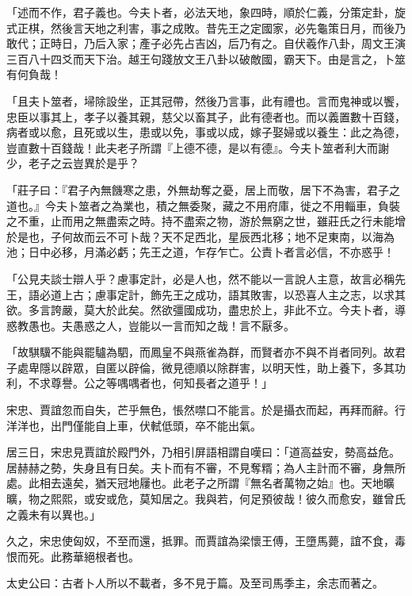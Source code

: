 \begin{pinyinscope}
「述而不作，君子義也。今夫卜者，必法天地，象四時，順於仁義，分策定卦，旋式正棋，然後言天地之利害，事之成敗。昔先王之定國家，必先龜策日月，而後乃敢代；正時日，乃后入家；產子必先占吉凶，后乃有之。自伏羲作八卦，周文王演三百八十四爻而天下治。越王句踐放文王八卦以破敵國，霸天下。由是言之，卜筮有何負哉！

「且夫卜筮者，埽除設坐，正其冠帶，然後乃言事，此有禮也。言而鬼神或以饗，忠臣以事其上，孝子以養其親，慈父以畜其子，此有德者也。而以義置數十百錢，病者或以愈，且死或以生，患或以免，事或以成，嫁子娶婦或以養生：此之為德，豈直數十百錢哉！此夫老子所謂『上德不德，是以有德』。今夫卜筮者利大而謝少，老子之云豈異於是乎？

「莊子曰：『君子內無饑寒之患，外無劫奪之憂，居上而敬，居下不為害，君子之道也。』今夫卜筮者之為業也，積之無委聚，藏之不用府庫，徙之不用輜車，負裝之不重，止而用之無盡索之時。持不盡索之物，游於無窮之世，雖莊氏之行未能增於是也，子何故而云不可卜哉？天不足西北，星辰西北移；地不足東南，以海為池；日中必移，月滿必虧；先王之道，乍存乍亡。公責卜者言必信，不亦惑乎！

「公見夫談士辯人乎？慮事定計，必是人也，然不能以一言說人主意，故言必稱先王，語必道上古；慮事定計，飾先王之成功，語其敗害，以恐喜人主之志，以求其欲。多言誇嚴，莫大於此矣。然欲彊國成功，盡忠於上，非此不立。今夫卜者，導惑教愚也。夫愚惑之人，豈能以一言而知之哉！言不厭多。

「故騏驥不能與罷驢為駟，而鳳皇不與燕雀為群，而賢者亦不與不肖者同列。故君子處卑隱以辟眾，自匿以辟倫，微見德順以除群害，以明天性，助上養下，多其功利，不求尊譽。公之等喁喁者也，何知長者之道乎！」

宋忠、賈誼忽而自失，芒乎無色，悵然噤口不能言。於是攝衣而起，再拜而辭。行洋洋也，出門僅能自上車，伏軾低頭，卒不能出氣。

居三日，宋忠見賈誼於殿門外，乃相引屏語相謂自嘆曰：「道高益安，勢高益危。居赫赫之勢，失身且有日矣。夫卜而有不審，不見奪糈；為人主計而不審，身無所處。此相去遠矣，猶天冠地屨也。此老子之所謂『無名者萬物之始』也。天地曠曠，物之熙熙，或安或危，莫知居之。我與若，何足預彼哉！彼久而愈安，雖曾氏之義未有以異也。」

久之，宋忠使匈奴，不至而還，抵罪。而賈誼為梁懷王傅，王墮馬薨，誼不食，毒恨而死。此務華絕根者也。

太史公曰：古者卜人所以不載者，多不見于篇。及至司馬季主，余志而著之。


\end{pinyinscope}
